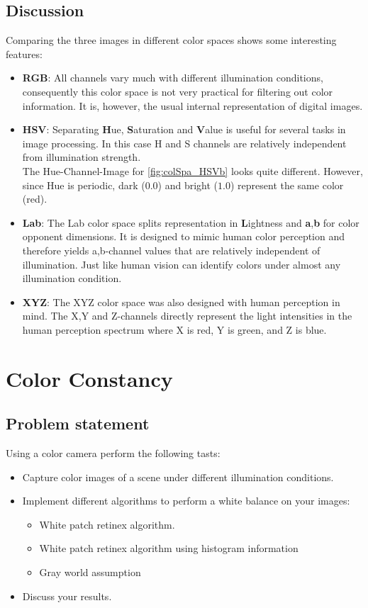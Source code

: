 \documentclass[
a4paper,     %
11pt         %
]{scrartcl}  %
\begin{document}
\clearpage
\subsection{Discussion}
Comparing the three images in different color spaces shows some interesting features:
\begin{itemize}
 \item \textbf{RGB}: All channels vary much with different illumination conditions, consequently this color space is not very practical for filtering out color information. It is, however, the usual internal representation of digital images.
 \item \textbf{HSV}: Separating \textbf Hue, \textbf Saturation and \textbf Value is useful for several tasks in image processing. In this case H and S channels are relatively independent from illumination strength.\\
 The Hue-Channel-Image for \cref{fig:colSpa_HSVb} looks quite different. However, since Hue is periodic, dark ($0.0$) and bright ($1.0$) represent the same color (red).
 \item \textbf{Lab}: The Lab color space splits representation in \textbf Lightness and \textbf{a},\textbf{b} for color opponent dimensions. It is designed to mimic human color perception and therefore yields a,b-channel values that are relatively independent of illumination. Just like human vision can identify colors under almost any illumination condition.
 \item \textbf{XYZ}: The XYZ color space was also designed with human perception in mind. The X,Y and Z-channels directly represent the light intensities in the human perception spectrum where X is red, Y is green, and Z is blue.
\end{itemize}

\newpage
\FloatBarrier
\section{Color Constancy}

\subsection{Problem statement}

Using a color camera perform the following tasts:
\begin{itemize}
 \item Capture color images of a scene under different illumination conditions.
 \item Implement different algorithms to perform a white balance on your images:
 \begin{itemize}
  \item White patch retinex algorithm.
  \item White patch retinex algorithm using histogram information
  \item Gray world assumption
 \end{itemize}
 \item Discuss your results.
\end{itemize}
\end{document}
